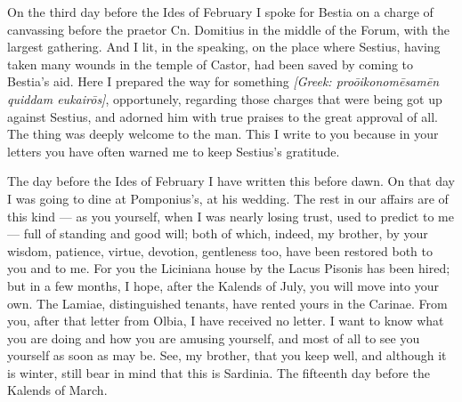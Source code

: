  On the third day before the Ides of February I spoke for Bestia on a charge of canvassing before the praetor Cn. Domitius in the middle of the Forum, with the largest gathering. And I lit, in the speaking, on the place where Sestius, having taken many wounds in the temple of Castor, had been saved by coming to Bestia's aid. Here I prepared the way for something \textit{[Greek: pro\=oikonom\=esam\=en quiddam eukair\=os]}, opportunely, regarding those charges that were being got up against Sestius, and adorned him with true praises to the great approval of all. The thing was deeply welcome to the man. This I write to you because in your letters you have often warned me to keep Sestius's gratitude.

 The day before the Ides of February I have written this before dawn. On that day I was going to dine at Pomponius's, at his wedding. The rest in our affairs are of this kind --- as you yourself, when I was nearly losing trust, used to predict to me --- full of standing and good will; both of which, indeed, my brother, by your wisdom, patience, virtue, devotion, gentleness too, have been restored both to you and to me. For you the Liciniana house by the Lacus Pisonis has been hired; but in a few months, I hope, after the Kalends of July, you will move into your own. The Lamiae, distinguished tenants, have rented yours in the Carinae. From you, after that letter from Olbia, I have received no letter. I want to know what you are doing and how you are amusing yourself, and most of all to see you yourself as soon as may be. See, my brother, that you keep well, and although it is winter, still bear in mind that this is Sardinia. The fifteenth day before the Kalends of March.
